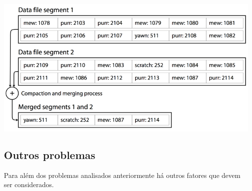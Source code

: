 \documentclass{article}
\begin{document}
\begin{flushleft}
  \begin{center}
    \includegraphics[scale=0.3]{43}
  \end{center}
\end{flushleft}

\subsection{Outros problemas}

Para além dos problemas analisados anteriormente há outros fatores que devem ser
considerados.

\vspace{2mm}
\end{document}
